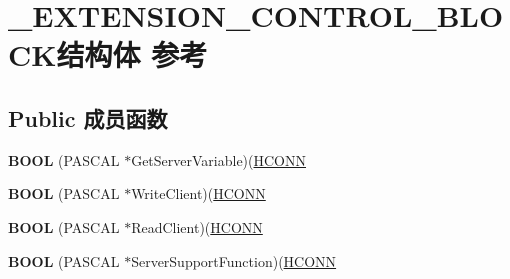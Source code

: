 \hypertarget{struct___e_x_t_e_n_s_i_o_n___c_o_n_t_r_o_l___b_l_o_c_k}{}\section{\+\_\+\+E\+X\+T\+E\+N\+S\+I\+O\+N\+\_\+\+C\+O\+N\+T\+R\+O\+L\+\_\+\+B\+L\+O\+C\+K结构体 参考}
\label{struct___e_x_t_e_n_s_i_o_n___c_o_n_t_r_o_l___b_l_o_c_k}
\subsection*{Public 成员函数}
\begin{DoxyCompactItemize}
\item 
\mbox{\label{struct___e_x_t_e_n_s_i_o_n___c_o_n_t_r_o_l___b_l_o_c_k_ab4f469f3a53d1ae1d9482a834181acf9}} 
{\bfseries B\+O\+OL} (P\+A\+S\+C\+AL $\ast$Get\+Server\+Variable)(\hyperlink{interfacevoid}{H\+C\+O\+NN}
\item 
\mbox{\label{struct___e_x_t_e_n_s_i_o_n___c_o_n_t_r_o_l___b_l_o_c_k_ac2939eec7d58481cfb5c0fb6fef95dbf}} 
{\bfseries B\+O\+OL} (P\+A\+S\+C\+AL $\ast$Write\+Client)(\hyperlink{interfacevoid}{H\+C\+O\+NN}
\item 
\mbox{\label{struct___e_x_t_e_n_s_i_o_n___c_o_n_t_r_o_l___b_l_o_c_k_a0a3ed3526c6282a25e75a65f107c5637}} 
{\bfseries B\+O\+OL} (P\+A\+S\+C\+AL $\ast$Read\+Client)(\hyperlink{interfacevoid}{H\+C\+O\+NN}
\item 
\mbox{\label{struct___e_x_t_e_n_s_i_o_n___c_o_n_t_r_o_l___b_l_o_c_k_a0c9dba7bad7e8e0ab895d915c669f49c}} 
{\bfseries B\+O\+OL} (P\+A\+S\+C\+AL $\ast$Server\+Support\+Function)(\hyperlink{interfacevoid}{H\+C\+O\+NN}
\end{DoxyCompactItemize}
